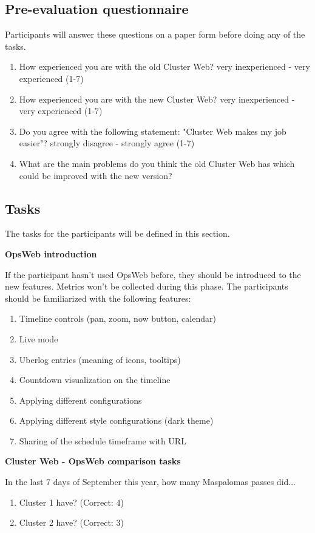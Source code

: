 \subsection{Pre-evaluation questionnaire} \label{pre-evaluation}
Participants will answer these questions on a paper form before doing any of the tasks.
\begin{enumerate}
\item How experienced you are with the old Cluster Web? very inexperienced - very experienced (1-7)
\item How experienced you are with the new Cluster Web? very inexperienced - very experienced (1-7)
\item Do you agree with the following statement: "Cluster Web makes my job easier"? strongly disagree - strongly agree (1-7)
\item What are the main problems do you think the old Cluster Web has which could be improved with the new version?
\end{enumerate}

\subsection{Tasks} \label{tasks_section}
The tasks for the participants will be defined in this section.

\textbf{OpsWeb introduction}

If the participant hasn't used OpsWeb before, they should be introduced to the new features. Metrics won't be collected during this phase. The participants should be familiarized with the following features:
\begin{enumerate}
\item Timeline controls (pan, zoom, now button, calendar)
\item Live mode
\item Uberlog entries (meaning of icons, tooltips)
\item Countdown visualization on the timeline
\item Applying different configurations
\item Applying different style configurations (dark theme)
\item Sharing of the schedule timeframe with URL
\end{enumerate}

\textbf{Cluster Web - OpsWeb comparison tasks}

In the last 7 days of September this year, how many Maspalomas passes did...
\begin{enumerate}
\item Cluster 1 have? (Correct: 4)
\item Cluster 2 have? (Correct: 3)
\end{enumerate}

